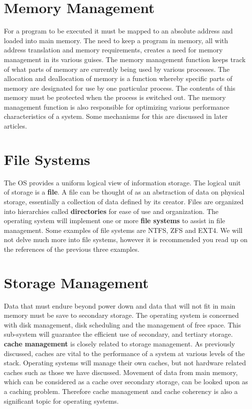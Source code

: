 \documentclass[10pt,a4paper]{article}
\begin{document}
\section{Memory Management}
For a program to be executed it must be mapped to an absolute address and loaded into main memory. The need to keep a program in memory, all with address translation and memory requirements, creates a need for memory management in its various guises. The memory management function keeps track of what parts of memory are currently being used by various processes. The allocation and deallocation of memory is a function whereby specific parts of memory are designated for use by one particular process. The contents of this memory must be protected when the process is switched out. The memory management function is also responsible for optimizing various performance characteristics of a system. Some mechanisms for this are discussed in later articles. 
\section{File Systems}
The OS provides a uniform logical view of information storage. The logical unit of storage is a {\bf file}. A file can be thought of as an abstraction of data on physical storage, essentially a collection of data defined by its creator. Files are organized into hierarchies called {\bf directories} for ease of use and organization. The operating system will implement one or more {\bf file systems} to assist in file management. Some examples of file systems are NTFS\cite{NTFS}, ZFS\cite{ZFS} and EXT4\cite{EXT4}. We will not delve much more into file systems, however it is recommended you read up on the references of the previous three examples. 
\section{Storage Management}
Data that must endure beyond power down and data that will not fit in main memory must be save to secondary storage. The operating system is concerned with disk management, disk scheduling and the management of free space. This sub-system will guarantee the efficient use of secondary, and tertiary storage. {\bf cache management} is closely related to storage management. As previously discussed, caches are vital to the performance of a system at various levels of the stack. Operating systems will manage their own caches, but not hardware related caches such as those we have discussed. Movement of data from main memory, which can be considered as a cache over secondary storage, can be looked upon as a caching problem. Therefore cache management and cache coherency is also a significant topic for operating systems. 
\end{document}

